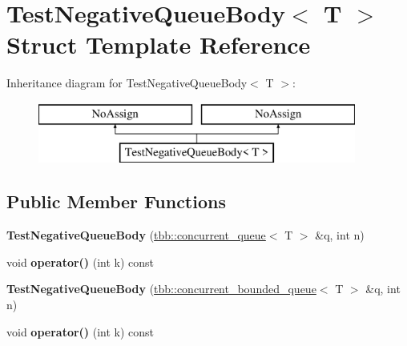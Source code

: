 \hypertarget{structTestNegativeQueueBody}{}\section{Test\+Negative\+Queue\+Body$<$ T $>$ Struct Template Reference}
\label{structTestNegativeQueueBody}
Inheritance diagram for Test\+Negative\+Queue\+Body$<$ T $>$\+:\begin{figure}[H]
\begin{center}
\leavevmode
\includegraphics[height=2.000000cm]{structTestNegativeQueueBody}
\end{center}
\end{figure}
\subsection*{Public Member Functions}
\begin{DoxyCompactItemize}
\item 
\hypertarget{structTestNegativeQueueBody_ad564cdddac5f4c68a2d0fd8488c3a386}{}{\bfseries Test\+Negative\+Queue\+Body} (\hyperlink{classtbb_1_1concurrent__queue}{tbb\+::concurrent\+\_\+queue}$<$ T $>$ \&q, int n)\label{structTestNegativeQueueBody_ad564cdddac5f4c68a2d0fd8488c3a386}

\item 
\hypertarget{structTestNegativeQueueBody_ad9efdfb4c93e2a0608e2b38ecb0e1786}{}void {\bfseries operator()} (int k) const \label{structTestNegativeQueueBody_ad9efdfb4c93e2a0608e2b38ecb0e1786}

\item 
\hypertarget{structTestNegativeQueueBody_a7c028ddfe9ede185056c063a9765b595}{}{\bfseries Test\+Negative\+Queue\+Body} (\hyperlink{classtbb_1_1concurrent__bounded__queue}{tbb\+::concurrent\+\_\+bounded\+\_\+queue}$<$ T $>$ \&q, int n)\label{structTestNegativeQueueBody_a7c028ddfe9ede185056c063a9765b595}

\item 
\hypertarget{structTestNegativeQueueBody_ad9efdfb4c93e2a0608e2b38ecb0e1786}{}void {\bfseries operator()} (int k) const \label{structTestNegativeQueueBody_ad9efdfb4c93e2a0608e2b38ecb0e1786}

\end{DoxyCompactItemize}
